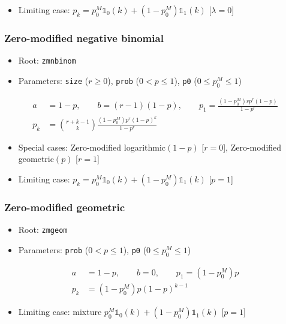 \documentclass[x11names]{article}
\newcommand{\code}[1]{\texttt{#1}}
\begin{document}
\begin{itemize}
\item Limiting case:
  $p_k = p_0^M \mathbb{1}_0(k) + (1 - p_0^M) \mathbb{1}_1(k)$ [$\lambda = 0$]
\end{itemize}

\subsubsection{Zero-modified negative binomial}

\begin{itemize}
\item Root: \code{zmnbinom}
\item Parameters: \code{size} ($r \geq 0$),
  \code{prob} ($0 < p \leq 1$),
  \code{p0} ($0 \leq p_0^M \leq 1$)
\end{itemize}
\begin{align*}
  a &= 1 - p, \qquad b = (r - 1)(1 - p), \qquad
      p_1 = \frac{(1 - p_0^M) r p^r (1 - p)}{1 - p^r} \\
  p_k &= \binom{r+k-1}{k} \frac{(1 - p_0^M) p^r (1 - p)^k}{1 - p^r}
\end{align*}

\begin{itemize}
\item Special cases: Zero-modified logarithmic$(1 - p)$ [$r = 0$],
  Zero-modified geometric$(p)$ [$r = 1$]
\item Limiting case:
  $p_k = p_0^M \mathbb{1}_0(k) + (1 - p_0^M) \mathbb{1}_1(k)$ [$p = 1$]
\end{itemize}

\subsubsection{Zero-modified geometric}

\begin{itemize}
\item Root: \code{zmgeom}
\item Parameters: \code{prob} ($0 < p \leq 1$),
  \code{p0} ($0 \leq p_0^M \leq 1$)
\end{itemize}
\begin{align*}
  a &= 1 - p, \qquad b = 0, \qquad p_1 = (1 - p_0^M) p \\
  p_k &= (1 - p_0^M) p (1 - p)^{k - 1}
\end{align*}

\begin{itemize}
\item Limiting case: mixture
  $p_0^M \mathbb{1}_0(k) + (1 - p_0^M) \mathbb{1}_1(k)$ [$p = 1$]
\end{itemize}
\end{document}
